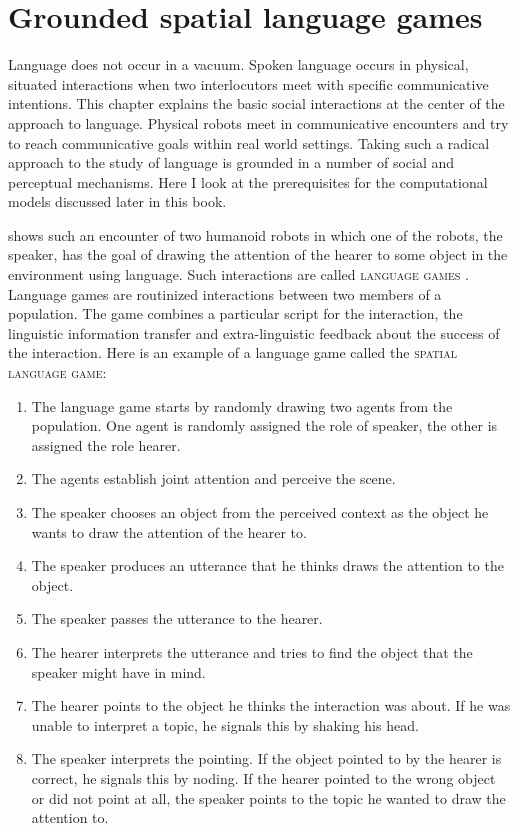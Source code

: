 %


\chapter{Grounded spatial language games}
\label{s:spatial-language-games}
Language does not occur in a vacuum. Spoken language occurs in physical,
situated interactions when two interlocutors meet with specific
communicative intentions. This chapter explains the basic social interactions 
at the center of the approach to language. Physical robots meet in communicative
encounters and try to reach communicative goals within real world settings. 
Taking such a radical approach to the study of language is grounded in a number of
social and perceptual mechanisms. Here I look at the prerequisites for 
the computational models discussed later in this book.

 shows such an encounter of
two humanoid robots in which one of the robots, the speaker, has the goal
of drawing the attention of the hearer to some object in the environment using language.
Such interactions are called \textsc{language games} \citep{steels2001language}.
Language games are routinized interactions between two members of 
a population. The game combines a particular script for the interaction, the linguistic
information transfer and extra-linguistic feedback about the success of the interaction.
Here is an example of a language game called the \textsc{spatial language game}:

\begin{enumerate}
\item The language game starts by randomly drawing two agents from the population. 
One agent is randomly assigned the role of speaker, the other is assigned the role
hearer.
\item The agents establish joint attention and perceive the scene.
\item The speaker chooses an object from the perceived context as the object
he wants to draw the attention of the hearer to.
\item The speaker produces an utterance that he thinks draws the attention to the object.
\item The speaker passes the utterance to the hearer.
\item The hearer interprets the utterance and tries to find the object that the speaker
might have in mind. 
\item The hearer points to the object he thinks the interaction was about. If he was unable 
to interpret a topic, he signals this by shaking his head.
\item The speaker interprets the pointing. If the object pointed to by the hearer
is correct, he signals this by noding. If the hearer pointed to the wrong object or
did not point at all, the speaker
points to the topic he wanted to draw the attention to.
\end{enumerate}


